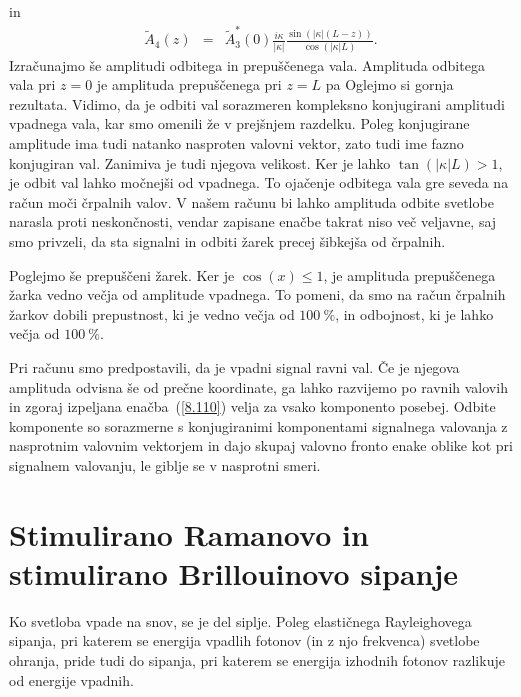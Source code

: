 in
\begin{eqnarray}
\tilde{A}_{4}\left(z\right) & = & \tilde{A}_3^*(0)\frac{i \kappa}{|\kappa|}
\frac{\sin\left(|\kappa|(L-z)\right)}{\cos\left(|\kappa|L\right)}.
\label{8.109}
\nonumber 
\end{eqnarray}
Izračunajmo še amplitudi odbitega in prepuščenega vala. Amplituda odbitega vala 
pri $z=0$ je 
amplituda prepuščenega pri $z = L$ pa
Oglejmo si gornja rezultata. Vidimo, da je odbiti val sorazmeren 
kompleksno konjugirani amplitudi vpadnega vala, kar smo omenili že v prejšnjem
razdelku. Poleg konjugirane amplitude ima tudi natanko nasproten valovni vektor, 
zato tudi ime fazno konjugiran val. Zanimiva je tudi njegova velikost. Ker 
je lahko $\tan\left(|\kappa|L\right)>1$, je odbit val lahko močnejši od vpadnega.
To ojačenje odbitega vala gre seveda na račun moči črpalnih
valov. V našem računu bi lahko amplituda odbite svetlobe narasla proti neskončnosti, 
vendar zapisane enačbe takrat niso več veljavne, saj smo privzeli, 
da sta signalni in odbiti žarek precej šibkejša od črpalnih.

Poglejmo še prepuščeni žarek. Ker je $\cos(x)\leq1$, je amplituda prepuščenega
žarka vedno večja od amplitude vpadnega. To pomeni, da smo na račun črpalnih žarkov
dobili prepustnost, ki je vedno večja od $100~\%$, in odbojnost, ki je lahko 
večja od $100~\%$.

Pri računu smo predpostavili, da je vpadni signal ravni val. Če je njegova
amplituda odvisna še od prečne koordinate, ga lahko razvijemo po ravnih
valovih in zgoraj izpeljana enačba~(\ref{8.110}) velja za vsako komponento posebej. 
Odbite komponente so sorazmerne s konjugiranimi komponentami signalnega valovanja
z nasprotnim valovnim vektorjem in dajo skupaj valovno fronto enake
oblike kot pri signalnem valovanju, le giblje se v nasprotni smeri.

\section{Stimulirano Ramanovo in stimulirano Brillouinovo sipanje}
Ko svetloba vpade na snov, se je del siplje. Poleg elastičnega 
Rayleighovega sipanja,
pri katerem se energija vpadlih fotonov (in z njo frekvenca) svetlobe ohranja, pride
tudi do sipanja, pri katerem se energija izhodnih fotonov razlikuje od energije vpadnih. 


